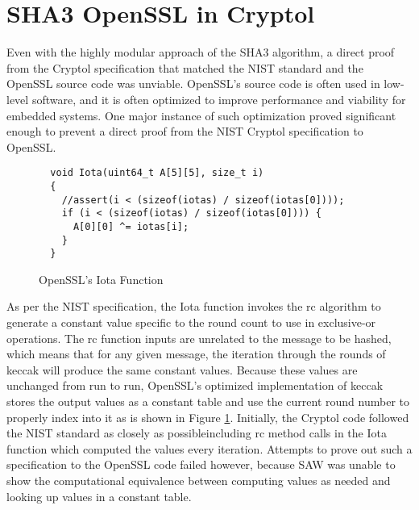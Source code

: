\section{SHA3 OpenSSL in Cryptol}\label{sec:openssl}
Even with the highly modular approach of the SHA3 algorithm, a direct proof from the Cryptol specification that matched the NIST standard and the OpenSSL source code was unviable.
OpenSSL's source code is often used in low-level software, and it is often optimized to improve performance and viability for embedded systems.
One major instance of such optimization proved significant enough to prevent a direct proof from the NIST Cryptol specification to OpenSSL.

\lstset{style=customc, firstnumber=177}
\begin{figure}[h]
  \centering
\begin{lstlisting}
  void Iota(uint64_t A[5][5], size_t i)
  {
    //assert(i < (sizeof(iotas) / sizeof(iotas[0])));
    if (i < (sizeof(iotas) / sizeof(iotas[0]))) {
      A[0][0] ^= iotas[i];
    }
  }
\end{lstlisting}
\caption{OpenSSL's Iota Function}
\label{fig:cIota}
\end{figure}

As per the NIST specification, the Iota function invokes the rc algorithm to generate a constant value specific to the round count to use in exclusive-or operations.
The rc function inputs are unrelated to the message to be hashed, which means that for any given message, the iteration through the rounds of keccak will produce the same constant values.
Because these values are unchanged from run to run, OpenSSL's optimized implementation of keccak stores the output values as a constant table and use the current round number to properly index into it as is shown in Figure \ref{fig:cIota}. 
Initially, the Cryptol code followed the NIST standard as closely as possible\textemdash including rc method calls in the Iota function which computed the values every iteration.
Attempts to prove out such a specification to the OpenSSL code failed however, because SAW was unable to show the computational equivalence between computing values as needed and looking up values in a constant table.

